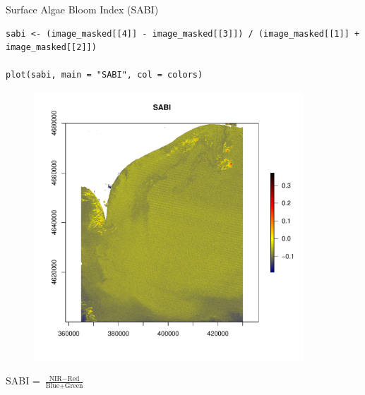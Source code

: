 \documentclass[10pt]{beamer}
\begin{document}
\begin{frame}[fragile]{Surface Algae Bloom Index (SABI)}
\begin{lstlisting}[firstnumber = 46]
sabi <- (image_masked[[4]] - image_masked[[3]]) / (image_masked[[1]] + image_masked[[2]])

plot(sabi, main = "SABI", col = colors)
\end{lstlisting}
\begin{minipage}{.6\textwidth}
\begin{figure}[ht]
\centering
\includegraphics[width=0.9\textwidth]{images/sabi.pdf}
\end{figure}  
\end{minipage}
 \begin{minipage}[b]{.35\textwidth}
 \centering 
\large SABI = \Large $\frac{\text{NIR} - \text{Red}}{\text{Blue} + \text{Green}}$ 
\end{minipage}
\end{frame}
\end{document}
